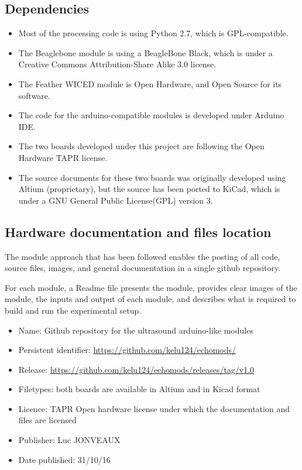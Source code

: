 \documentclass[letterpaper, 10 pt, conference]{ieeeconf} %
\begin{document}
\subsection{Dependencies}

\begin{itemize}

\item Most of the processing code is using Python 2.7, which is GPL-compatible.
\item The Beaglebone module is using a BeagleBone Black, which is under a Creative Commons Attribution-Share Alike 3.0 license.
\item The Feather WICED module is Open Hardware, and Open Source for its software.
\item The code for the arduino-compatible modules is developed under Arduino IDE.
\item The two boards developed under this project are following the Open Hardware TAPR license. 
\item The source documents for these two boards was originally developed using Altium (proprietary), but the source has been ported to KiCad, which is under a GNU General Public License(GPL) version 3.
\end{itemize}

\subsection{Hardware documentation and files location} 

The module approach that has been followed enables the posting of all code, source files, images, and general documentation in a single github repository.

For each module, a Readme file presents the module, provides clear images of the module, the inputs and output of each module, and describes what is required to build and run the experimental setup.

\begin{itemize}
\item Name: Github repository for the ultrasound arduino-like modules
\item Persistent identifier: \url{https://github.com/kelu124/echomods/}
\item Release: \url{https://github.com/kelu124/echomods/releases/tag/v1.0} 
\item Filetypes: both boards are available in Altium and in Kicad format
\item Licence: TAPR Open hardware license under which the documentation and files are licensed
\item Publisher: Luc JONVEAUX
\item Date published: 31/10/16
\end{itemize}
\end{document}
